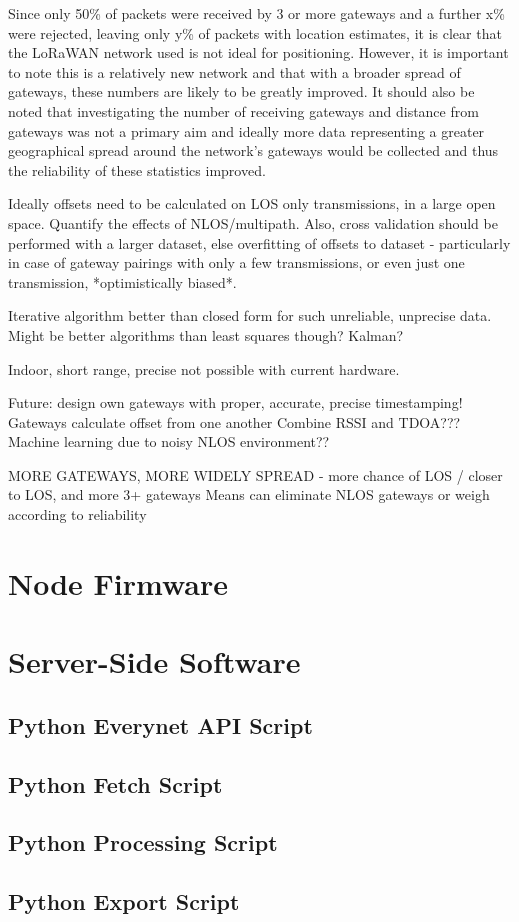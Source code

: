 \documentclass[a4paper]{report}
\begin{document}
  Since only 50\% of packets were received by 3 or more gateways and a further x\% were rejected, leaving only y\% of packets with location estimates, it is clear that the LoRaWAN network used is not ideal for positioning. However, it is important to note this is a relatively new network and that with a broader spread of gateways, these numbers are likely to be greatly improved. It should also be noted that investigating the number of receiving gateways and distance from gateways was not a primary aim and ideally more data representing a greater geographical spread around the network's gateways would be collected and thus the reliability of these statistics improved.

  Ideally offsets need to be calculated on LOS only transmissions, in a large open space. Quantify the effects of NLOS/multipath. Also, cross validation should be performed with a larger dataset, else overfitting of offsets to dataset - particularly in case of gateway pairings with only a few transmissions, or even just one transmission, *optimistically biased*.

  Iterative algorithm better than closed form for such unreliable, unprecise data. Might be better algorithms than least squares though? Kalman?

  Indoor, short range, precise not possible with current hardware.

  Future: design own gateways with proper, accurate, precise timestamping! Gateways calculate offset from one another
  Combine RSSI and TDOA???   Machine learning due to noisy NLOS environment??

  MORE GATEWAYS, MORE WIDELY SPREAD - more chance of LOS / closer to LOS, and more 3+ gateways
  Means can eliminate NLOS gateways or weigh according to reliability \cite{ElGemayel2013}






\appendix
\chapter{Node Firmware} \label{ap:nodefirmware}

\chapter{Server-Side Software}
  \section{Python Everynet API Script} \label{ap:servereverynet}
  \section{Python Fetch Script} \label{ap:serverfetch}
  \section{Python Processing Script} \label{ap:serverprocess}
  \section{Python Export Script} \label{ap:serverexport}
\end{document}
